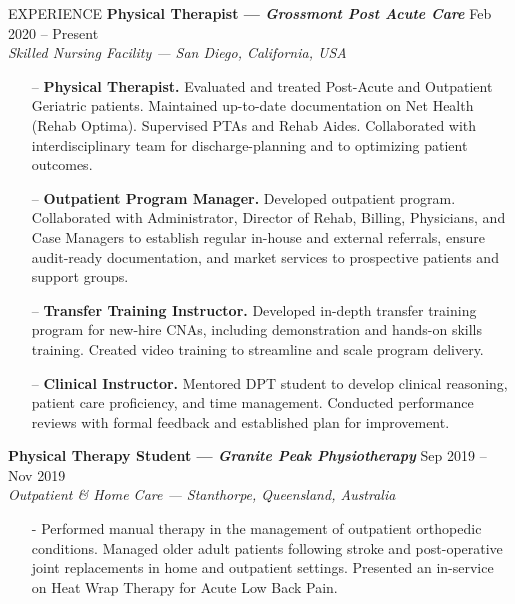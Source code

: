 \documentclass{resume} %
\begin{document}
\begin{rSection}{EXPERIENCE}
\textbf{Physical Therapist --- \textit{Grossmont Post Acute Care}} \hfill Feb 2020 -- Present\\
\textit{Skilled Nursing Facility --- San Diego, California, USA}
\vspace*{-0.2cm}\begin{itemize}
    \item[--] \textbf{Physical Therapist.} Evaluated and treated Post-Acute and Outpatient Geriatric patients. Maintained up-to-date documentation on Net Health (Rehab Optima). Supervised PTAs and Rehab Aides. Collaborated with interdisciplinary team for discharge-planning and to optimizing patient outcomes.
    \item[--] \textbf{Outpatient Program Manager.} Developed outpatient program. Collaborated with Administrator, Director of Rehab, Billing, Physicians, and Case Managers to establish regular in-house and external referrals, ensure audit-ready documentation, and market services to prospective patients and support groups.
    \item[--] \textbf{Transfer Training Instructor.} Developed in-depth transfer training program for new-hire CNAs, including demonstration and hands-on skills training. Created video training to streamline and scale program delivery.
    \item[--] \textbf{Clinical Instructor.} Mentored DPT student to develop clinical reasoning, patient care proficiency, and time management. Conducted performance reviews with formal feedback and established plan for improvement.
\end{itemize}

\textbf{Physical Therapy Student --- \textit{Granite Peak Physiotherapy}} 
\hfill Sep 2019 -- Nov 2019\\
\textit{Outpatient \& Home Care --- Stanthorpe, Queensland, Australia}
\vspace*{-0.2cm}\begin{itemize}
    \item[-] Performed manual therapy in the management of outpatient orthopedic conditions. Managed older adult patients following stroke and post-operative joint replacements in home and outpatient settings. Presented an in-service on Heat Wrap Therapy for Acute Low Back Pain.
\end{itemize}


\end{rSection}
\end{document}
